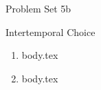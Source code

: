 \documentclass{handout}
\begin{document}
\thispagestyle{empty}

\centerline{\Large Problem Set 5b}
\centerline{\large Intertemporal Choice}

\begin{enumerate} 


\item {body.tex}

\item {body.tex}

\end{enumerate}


\end{document}
